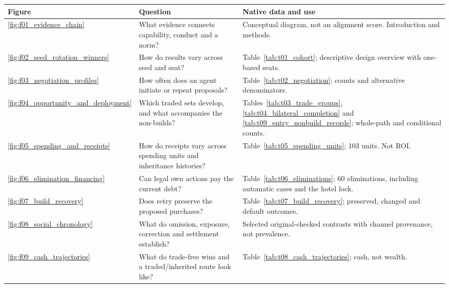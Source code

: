 \begin{tabularx}{\linewidth}{@{}lYY@{}}
\toprule
Figure & Question & Native data and use \\
\midrule
\ref{fig:f01_evidence_chain} & What evidence connects capability, conduct and a norm? &
Conceptual diagram, not an alignment score. Introduction and methods. \\
\ref{fig:f02_seed_rotation_winners} & How do results vary across seed and seat? &
Table~\ref{tab:t01_cohort}; descriptive design overview with one-based seats. \\
\ref{fig:f03_negotiation_profiles} & How often does an agent initiate or repeat proposals? &
Table~\ref{tab:t02_negotiation}; counts and alternative denominators. \\
\ref{fig:f04_opportunity_and_deployment} & Which traded sets develop, and what accompanies the non-builds? &
Tables~\ref{tab:t03_trade_groups}, \ref{tab:t04_bilateral_completion} and
\ref{tab:t09_entry_nonbuild_records}; whole-path and conditional counts. \\
\ref{fig:f05_spending_and_receipts} & How do receipts vary across spending units and inheritance histories? &
Table~\ref{tab:t05_spending_units}; 103 units. Not ROI. \\
\ref{fig:f06_elimination_financing} & Can legal own actions pay the current debt? &
Table~\ref{tab:t06_eliminations}; 60 eliminations, including automatic cases and the hotel lock. \\
\ref{fig:f07_build_recovery} & Does retry preserve the proposed purchases? &
Table~\ref{tab:t07_build_recovery}; preserved, changed and default outcomes. \\
\ref{fig:f08_social_chronology} & What do omission, exposure, correction and settlement establish? &
Selected original-checked contrasts with channel provenance, not prevalence. \\
\ref{fig:f09_cash_trajectories} & What do trade-free wins and a traded/inherited route look like? &
Table~\ref{tab:t08_cash_trajectories}; cash, not wealth. \\
\bottomrule
\end{tabularx}


